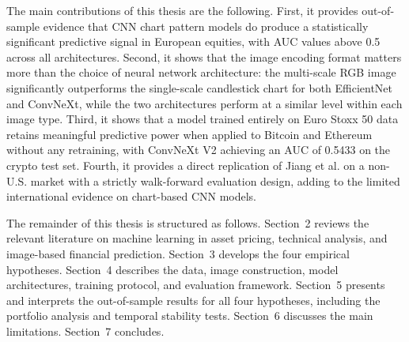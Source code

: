 The main contributions of this thesis are the following. First, it provides out-of-sample evidence that CNN chart pattern models do produce a statistically significant predictive signal in European equities, with AUC values above 0.5 across all architectures. Second, it shows that the image encoding format matters more than the choice of neural network architecture: the multi-scale RGB image significantly outperforms the single-scale candlestick chart for both EfficientNet and ConvNeXt, while the two architectures perform at a similar level within each image type. Third, it shows that a model trained entirely on Euro Stoxx 50 data retains meaningful predictive power when applied to Bitcoin and Ethereum without any retraining, with ConvNeXt V2 achieving an AUC of 0.5433 on the crypto test set. Fourth, it provides a direct replication of Jiang et al. on a non-U.S. market with a strictly walk-forward evaluation design, adding to the limited international evidence on chart-based CNN models.

The remainder of this thesis is structured as follows. Section~2 reviews the relevant literature on machine learning in asset pricing, technical analysis, and image-based financial prediction. Section~3 develops the four empirical hypotheses. Section~4 describes the data, image construction, model architectures, training protocol, and evaluation framework. Section~5 presents and interprets the out-of-sample results for all four hypotheses, including the portfolio analysis and temporal stability tests. Section~6 discusses the main limitations. Section~7 concludes.
